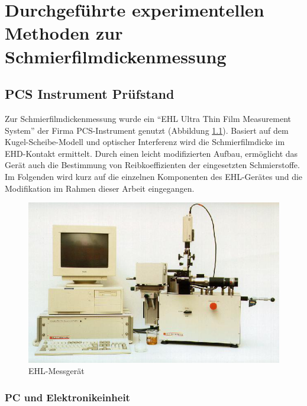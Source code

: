 \chapter{Durchgeführte experimentellen Methoden zur Schmierfilmdickenmessung}
\label{chap:durchgefuehrte_experimentellen_methoden}

\section{PCS Instrument Prüfstand}
\label{sec:pcs_pruefstand}

Zur Schmierfilmdickenmessung wurde ein ``EHL Ultra Thin Film Measurement System'' der Firma PCS-Instrument genutzt (Abbildung \ref{fig:ehl_messgeraet}).
Basiert auf dem Kugel-Scheibe-Modell und optischer Interferenz wird die Schmierfilmdicke im EHD-Kontakt ermittelt.
Durch einen leicht modifizierten Aufbau, ermöglicht das Gerät auch die Bestimmung von Reibkoeffizienten der eingesetzten Schmierstoffe.
Im Folgenden wird kurz auf die einzelnen Komponenten des EHL-Gerätes und die Modifikation im Rahmen dieser Arbeit eingegangen.

\begin{figure}[htb]
    \centering
    \includegraphics[width=0.8\linewidth]{./images/ehl_pruefstand.png}
    \caption{EHL-Messgerät \cite{ehl}}
    \label{fig:ehl_messgeraet}
\end{figure}

\subsection{PC und Elektronikeinheit}
\label{sub:pc_elektronikeinheit}

